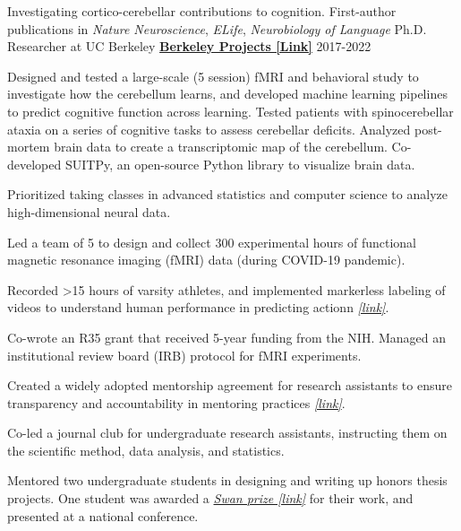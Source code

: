 \begin{cventries}
  \cventry
  	{Investigating cortico-cerebellar contributions to cognition. First-author publications in \textit{Nature Neuroscience}, \textit{ELife}, \textit{Neurobiology of Language}}
    {Ph.D. Researcher at UC Berkeley} %
    {\href{https://github.com/maedbhk/}{\textbf{Berkeley Projects [Link]}}}
    {2017-2022} %
    {
      \begin{cvitems} %
        \item {Designed and tested a large-scale (5 session) fMRI and behavioral study to investigate how the cerebellum learns, and developed machine learning pipelines to predict cognitive function across learning. Tested patients with spinocerebellar ataxia on a series of cognitive tasks to assess cerebellar deficits. Analyzed post-mortem brain data to create a transcriptomic map of the cerebellum. Co-developed SUITPy, an open-source Python library to visualize brain data.}
        \item {Prioritized taking classes in advanced statistics and computer science to analyze high-dimensional neural data.} 
        \item {Led a team of 5 to design and collect 300 experimental hours of functional magnetic resonance imaging (fMRI) data (during COVID-19 pandemic).}
        \item {Recorded >15 hours of varsity athletes, and implemented markerless labeling of videos to understand human performance in predicting actionn \href{https://github.com/maedbhk/action_prediction}{\textit{[link]}}.}
        \item {Co-wrote an R35 grant that received 5-year funding from the NIH. Managed an institutional review board (IRB) protocol for fMRI experiments.}
        \item {Created a widely adopted mentorship agreement for research assistants to ensure transparency and accountability in mentoring practices \href{https://drive.google.com/file/d/1m7PI3lnOZpKdLxWAtxvjcXeQ3xG7I8r0/view?usp=sharing}{\textit{[link]}}.}
        \item {Co-led a journal club for undergraduate research assistants, instructing them on the scientific method, data analysis, and statistics.}
        \item {Mentored two undergraduate students in designing and writing up honors thesis projects. One student was awarded a \href{https://psychology.berkeley.edu/sites/default/files/undergraduate-program/swanaward_application_2019-2020.pdf}{\textit{Swan prize [link]}} for their work, and presented at a national conference.}
      \end{cvitems}
      }
    

\end{cventries}
